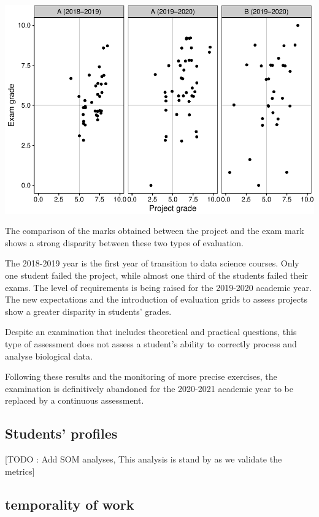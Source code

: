 \documentclass[
]{article}
\begin{document}
\includegraphics{teaching_data_science_files/figure-latex/unnamed-chunk-3-1.pdf}

The comparison of the marks obtained between the project and the exam
mark shows a strong disparity between these two types of evaluation.

The 2018-2019 year is the first year of transition to data science
courses. Only one student failed the project, while almost one third of
the students failed their exams. The level of requirements is being
raised for the 2019-2020 academic year. The new expectations and the
introduction of evaluation grids to assess projects show a greater
disparity in students' grades.

Despite an examination that includes theoretical and practical
questions, this type of assessment does not assess a student's ability
to correctly process and analyse biological data.

Following these results and the monitoring of more precise exercises,
the examination is definitively abandoned for the 2020-2021 academic
year to be replaced by a continuous assessment.

\hypertarget{students-profiles}{%
\subsection{Students' profiles}\label{students-profiles}}

{[}TODO : Add SOM analyses, This analysis is stand by as we validate the
metrics{]}

\hypertarget{temporality-of-work}{%
\subsection{temporality of work}\label{temporality-of-work}}
\end{document}
